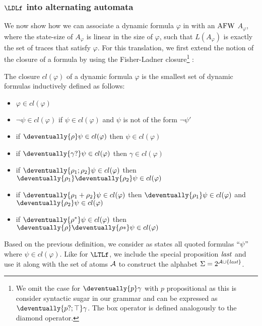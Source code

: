 \subsubsection{$\LDLf$ into alternating automata}

We now show how we can associate a dynamic formula $\varphi$ in \nnf with an $\mathrm{AFW}$ $A_\varphi$, where the state-size of $A_\varphi$ is linear in the size of $\varphi$, such that $L(A_\varphi)$ is exactly the set of traces that satisfy $\varphi$. For this translation, we first extend the notion of the closure of a formula by using the Fisher-Ladner closure\footnote{We omit the case for $\deventually{p}\gamma$ with $p$ propositional as this is consider syntactic sugar in our grammar and can be expressed as $\deventually{p?;\top}\gamma$. The box operator is defined analogously to the diamond operator.} \cite{fislad79a}:

\begin{definition}
    The closure $cl(\varphi)$ of a dynamic formula $\varphi$ is the smallest set of dynamic formulas inductively defined as follows:
    
    \begin{itemize}
        \item $\varphi \in cl(\varphi)$
        \item $\neg \psi \in cl(\varphi)$ if $\psi \in cl(\varphi)$ and  $\psi$ is not of the form $\neg \psi'$
        \item if $\deventually{\rho}\psi \in cl(\varphi)$ then $\psi\in cl(\varphi)$ 
        \item if $\deventually{\gamma?}\psi \in cl(\varphi)$ then $\gamma \in cl(\varphi)$
        \item if $\deventually{\rho_1;\rho_2}\psi \in cl(\varphi)$ then $\deventually{\rho_1}\deventually{\rho_2}\psi \in cl(\varphi)$
        \item if $\deventually{\rho_1+\rho_2}\psi \in cl(\varphi)$ then $\deventually{\rho_1}\psi \in cl(\varphi)$ and $\deventually{\rho_2}\psi \in cl(\varphi)$
        \item if $\deventually{\rho^*}\psi \in cl(\varphi)$ then $\deventually{\rho}\deventually{\rho*}\psi \in cl(\varphi)$
    \end{itemize}
\end{definition}


Based on the previous definition, we consider as states all quoted formulas $``\psi"$ where $\psi \in cl(\varphi)$. Like for $\LTLf$, we include the special proposition $\mathit{last}$ and use it along with the set of atoms $\mathcal{A }$ to construct the alphabet $\Sigma=2^{\mathcal{A } \cup \{\mathit{last}\}}$.

